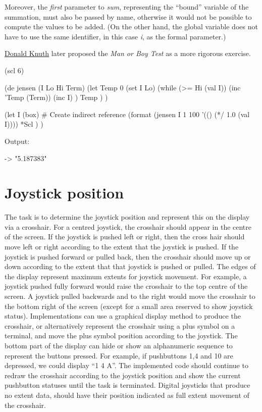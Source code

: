 Moreover, the \emph{first} parameter to \emph{sum}, representing the
``bound'' variable of the summation, must also be passed by name,
otherwise it would not be possible to compute the values to be added.
(On the other hand, the global variable does not have to use the same
identifier, in this case \emph{i}, as the formal parameter.)

\href{http://en.wikipedia.org/wiki/Donald\_Knuth}{Donald Knuth} later
proposed the \emph{Man or Boy Test} as a more
rigorous exercise.


\begin{wideverbatim}

(scl 6)

(de jensen (I Lo Hi Term)
   (let Temp 0
      (set I Lo)
      (while (>= Hi (val I))
         (inc 'Temp (Term))
         (inc I) )
      Temp ) )

(let I (box)  # Create indirect reference
   (format
      (jensen I 1 100 '(() (*/ 1.0 (val I))))
      *Scl ) )

Output:

-> "5.187383"

\end{wideverbatim}

\pagebreak{}
\section*{Joystick position}

The task is to determine the joystick position and represent this on
the display via a crosshair. For a centred joystick, the crosshair
should appear in the centre of the screen. If the joystick is pushed
left or right, then the cross hair should move left or right according
to the extent that the joystick is pushed. If the joystick is pushed
forward or pulled back, then the crosshair should move up or down
according to the extent that that joystick is pushed or pulled. The
edges of the display represent maximum extents for joystick movement.
For example, a joystick pushed fully forward would raise the crosshair
to the top centre of the screen. A joystick pulled backwards and to
the right would move the crosshair to the bottom right of the screen
(except for a small area reserved to show joystick status).
Implementations can use a graphical display method to produce the
crosshair, or alternatively represent the crosshair using a plus
symbol on a terminal, and move the plus symbol position according to
the joystick. The bottom part of the display can hide or show an
alphanumeric sequence to represent the buttons pressed. For example,
if pushbuttons 1,4 and 10 are depressed, we could display ``1 4 A''.
The implemented code should continue to redraw the crosshair according
to the joystick position and show the current pushbutton statuses
until the task is terminated. Digital joysticks that produce no extent
data, should have their position indicated as full extent movement of
the crosshair.

